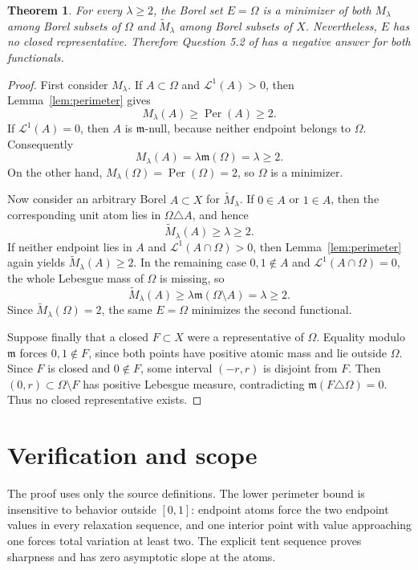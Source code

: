 \documentclass[11pt]{article}
\newtheorem{theorem}{Theorem}
\newcommand{\Per}{\operatorname{Per}}
\newcommand{\Leb}{\mathcal L^1}
\begin{document}
\begin{theorem}\label{thm:counterexample}
For every $\lambda\ge2$, the Borel set $E=\Omega$ is a minimizer of both
$M_\lambda$ among Borel subsets of $\Omega$ and
$\widetilde M_\lambda$ among Borel subsets of $X$.  Nevertheless, $E$ has no
closed representative.  Therefore Question 5.2 of \cite{KLR} has a negative
answer for both functionals.
\end{theorem}

\begin{proof}
First consider $M_\lambda$.  If $A\subset\Omega$ and $\Leb(A)>0$, then
Lemma~\ref{lem:perimeter} gives
\[
 M_\lambda(A)\ge\Per(A)\ge2.
\]
If $\Leb(A)=0$, then $A$ is $\mathfrak m$-null, because neither endpoint
belongs to $\Omega$.  Consequently
\[
 M_\lambda(A)=\lambda\mathfrak m(\Omega)=\lambda\ge2.
\]
On the other hand,
$M_\lambda(\Omega)=\Per(\Omega)=2$, so $\Omega$ is a minimizer.

Now consider an arbitrary Borel $A\subset X$ for
$\widetilde M_\lambda$.  If $0\in A$ or $1\in A$, then the corresponding
unit atom lies in $\Omega\triangle A$, and hence
\[
 \widetilde M_\lambda(A)\ge\lambda\ge2.
\]
If neither endpoint lies in $A$ and $\Leb(A\cap\Omega)>0$, then
Lemma~\ref{lem:perimeter} again yields
$\widetilde M_\lambda(A)\ge2$.  In the remaining case
$0,1\notin A$ and $\Leb(A\cap\Omega)=0$, the whole Lebesgue mass of $\Omega$
is missing, so
\[
 \widetilde M_\lambda(A)\ge
 \lambda\mathfrak m(\Omega\setminus A)=\lambda\ge2.
\]
Since $\widetilde M_\lambda(\Omega)=2$, the same $E=\Omega$ minimizes the
second functional.

Suppose finally that a closed $F\subset X$ were a representative of
$\Omega$.  Equality modulo $\mathfrak m$ forces $0,1\notin F$, since both
points have positive atomic mass and lie outside $\Omega$.  Since $F$ is
closed and $0\notin F$, some interval $(-r,r)$ is disjoint from $F$.
Then $(0,r)\subset\Omega\setminus F$ has positive Lebesgue measure,
contradicting $\mathfrak m(F\triangle\Omega)=0$.  Thus no closed
representative exists.
\end{proof}

\section{Verification and scope}

The proof uses only the source definitions.  The lower perimeter bound is
insensitive to behavior outside $[0,1]$: endpoint atoms force the two endpoint
values in every relaxation sequence, and one interior point with value
approaching one forces total variation at least two.  The explicit tent
sequence proves sharpness and has zero asymptotic slope at the atoms.
\end{document}
